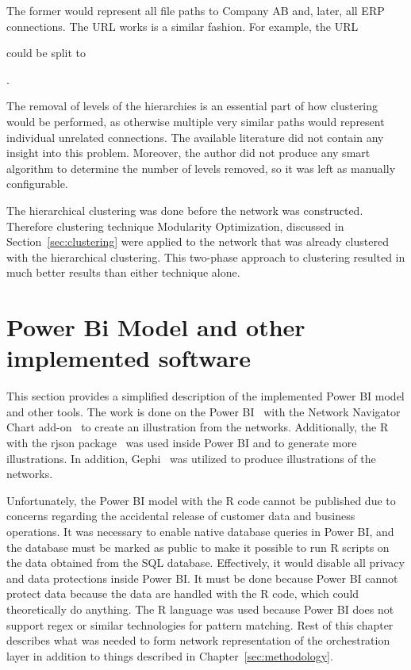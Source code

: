 \documentclass[english, 12pt, a4paper, sci, utf8, a-2b, online, obeyspaces]{aaltothesis}
\begin{document}
The former would represent all file paths to Company AB and, later, all ERP connections. The URL works is a similar fashion. For example, the URL 
\begin{center}
\end{center}
could be split to 
\begin{center}
    .
\end{center}

The removal of levels of the hierarchies is an essential part of how clustering would be performed, as otherwise multiple very similar paths would represent individual unrelated connections. The available literature did not contain any insight into this problem. Moreover, the author did not produce any smart algorithm to determine the number of levels removed, so it was left as manually configurable. 

The hierarchical clustering was done before the network was constructed. Therefore clustering technique Modularity Optimization, discussed in Section~\ref{sec:clustering} were applied to the network that was already clustered with the hierarchical clustering. This two-phase approach to clustering resulted in much better results than either technique alone.

\clearpage
\section{Power Bi Model and other implemented software}
\label{sec:powerbi_model_and_r}
This section provides a simplified description of the implemented Power BI model and other tools. The work is done on the Power BI~\cite{microsoft2018power} with the Network Navigator Chart add-on~\cite{microsoft2018network} to create an illustration from the networks. Additionally, the R~\cite{r2018language} with the rjson package~\cite{alex2014rjson} was used inside Power BI and to generate more illustrations. In addition, Gephi~\cite{bastian2004gephi} was utilized to produce illustrations of the networks.

Unfortunately, the Power BI model with the R code cannot be published due to concerns regarding the accidental release of customer data and business operations. It was necessary to enable native database queries in Power BI, and the database must be marked as public to make it possible to run R scripts on the data obtained from the SQL database. Effectively, it would disable all privacy and data protections inside Power BI. It must be done because Power BI cannot protect data because the data are handled with the R code, which could theoretically do anything. The R language was used because Power BI does not support regex or similar technologies for pattern matching. Rest of this chapter describes what was needed to form network representation of the orchestration layer in addition to things described in Chapter~\ref{sec:methodology}. 
\end{document}
